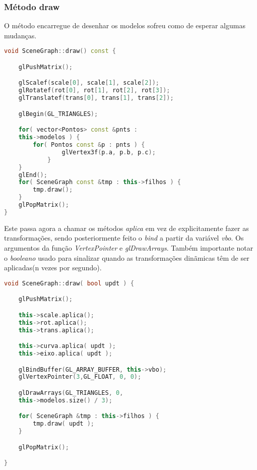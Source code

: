\documentclass{article}
\begin{document}
\subsubsection*{Método draw}

O método encarregue de desenhar os modelos sofreu como de esperar algumas mudanças.

\begin{file}
        \begin{lstlisting}[language=C++]
void SceneGraph::draw() const {

    glPushMatrix();

    glScalef(scale[0], scale[1], scale[2]);
    glRotatef(rot[0], rot[1], rot[2], rot[3]);
    glTranslatef(trans[0], trans[1], trans[2]);

    glBegin(GL_TRIANGLES);

    for( vector<Pontos> const &pnts : 
	this->modelos ) {
        for( Pontos const &p : pnts ) {
                glVertex3f(p.a, p.b, p.c);
            }
    }
    glEnd();
    for( SceneGraph const &tmp : this->filhos ) {
        tmp.draw();
    }
    glPopMatrix();
}
	\end{lstlisting}
\end{file}

Este passa agora a chamar os métodos \textit{aplica} em vez de explicitamente fazer as transformações, sendo posteriormente feito o \textit{bind} a partir da variável \textit{vbo}. Os argumentos da função \textit{VertexPointer} e \textit{glDrawArrays}. Também importante notar o \textit{booleano} usado para sinalizar quando as transformações dinãmicas têm de ser aplicadas(n vezes por segundo).

\begin{file}
        \begin{lstlisting}[language=C++]
void SceneGraph::draw( bool updt ) {

    glPushMatrix();

    this->scale.aplica();
    this->rot.aplica();
    this->trans.aplica();

    this->curva.aplica( updt );
    this->eixo.aplica( updt );

    glBindBuffer(GL_ARRAY_BUFFER, this->vbo);
    glVertexPointer(3,GL_FLOAT, 0, 0);

    glDrawArrays(GL_TRIANGLES, 0, 
	this->modelos.size() / 3);

    for( SceneGraph &tmp : this->filhos ) {
        tmp.draw( updt );
    }

    glPopMatrix();

}
	\end{lstlisting}
\end{file}
\end{document}
